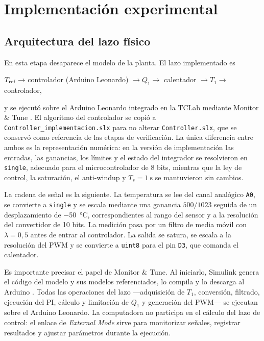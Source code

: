 \section{Implementación experimental}

\subsection{Arquitectura del lazo físico}

En esta etapa desaparece el modelo de la planta. El lazo implementado es

\begin{center}
$T_{\mathrm{ref}} \rightarrow$ controlador (Arduino Leonardo) $\rightarrow Q_1 \rightarrow$ calentador
$\rightarrow T_1 \rightarrow$ controlador,
\end{center}

y se ejecutó sobre el Arduino Leonardo integrado en la TCLab mediante Monitor \& Tune
\cite{mw_arduino}. El algoritmo del controlador se copió a
\texttt{Controller\_implementacion.slx} para no alterar \texttt{Controller.slx}, que se conservó
como referencia de las etapas de verificación. La única diferencia entre ambos es la representación
numérica: en la versión de implementación las entradas, las ganancias, los límites y el estado del
integrador se resolvieron en \texttt{single}, adecuado para el microcontrolador de 8 bits, mientras
que la ley de control, la saturación, el anti-windup y $T_s = \SI{1}{\second}$ se mantuvieron sin
cambios.

La cadena de señal es la siguiente. La temperatura se lee del canal analógico \texttt{A0}, se
convierte a \texttt{single} y se escala mediante una ganancia $500/1023$ seguida de un
desplazamiento de \SI{-50}{\celsius}, correspondientes al rango del sensor y a la resolución del
convertidor de 10 bits. La medición pasa por un filtro de media móvil con $\lambda = 0{,}5$ antes de
entrar al controlador. La salida se satura, se escala a la resolución del PWM y se convierte a
\texttt{uint8} para el pin \texttt{D3}, que comanda el calentador.

Es importante precisar el papel de Monitor \& Tune. Al iniciarlo, Simulink genera el código del
modelo y sus modelos referenciados, lo compila y lo descarga al Arduino
\cite{mw_arduino_workflows}. Todas las operaciones del lazo ---adquisición de $T_1$, conversión,
filtrado, ejecución del PI, cálculo y limitación de $Q_1$ y generación del PWM--- se ejecutan sobre
el Arduino Leonardo. La computadora no participa en el cálculo del lazo de control: el enlace de
\emph{External Mode} sirve para monitorizar señales, registrar resultados y ajustar parámetros
durante la ejecución.

